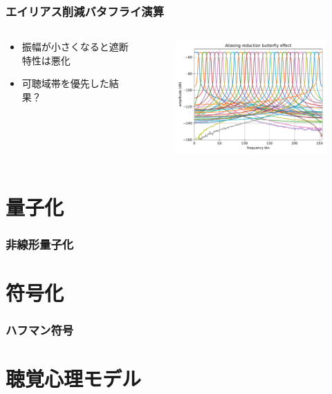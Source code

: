 \documentclass[14pt,xcolor=dvipsnames,table,dvipdfmx]{beamer}
\begin{document}
\begin{frame}[c]
    \frametitle{エイリアス削減バタフライ演算}
    \begin{columns}
        \begin{column}{0.35\textwidth}
            \begin{itemize}
                \item 振幅が小さくなると遮断特性は悪化
                \item 可聴域帯を優先した結果？
            \end{itemize}
        \end{column}
        \begin{column}{0.7\textwidth}
            \begin{figure}
                \includegraphics[width=85mm]{./figs/MP3_aliasing_reduction_butterfly_butterfly.pdf}
            \end{figure}
        \end{column}
    \end{columns}
\end{frame}

\section{量子化}

\begin{frame}[c]
    \frametitle{非線形量子化}
\end{frame}

\section{符号化}

\begin{frame}[c]
    \frametitle{ハフマン符号}
\end{frame}

\section{聴覚心理モデル}
\end{document}

